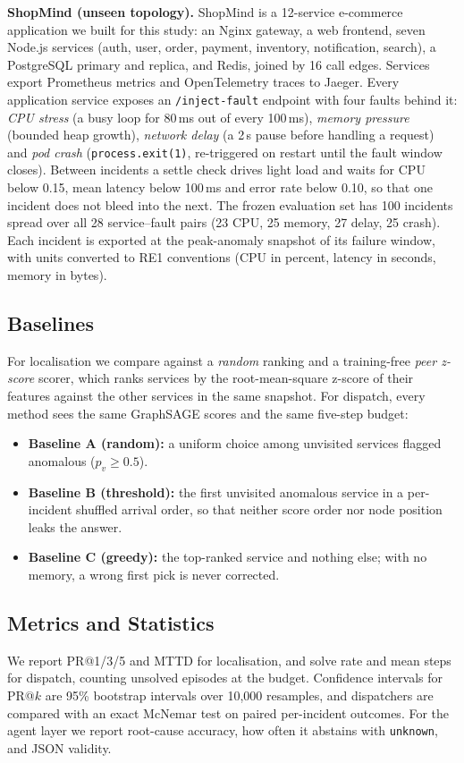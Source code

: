 \documentclass[conference,a4paper]{IEEEtran}
\begin{document}
\textbf{ShopMind (unseen topology).} ShopMind is a 12-service e-commerce application we built for this study: an Nginx gateway, a web frontend, seven Node.js services (auth, user, order, payment, inventory, notification, search), a PostgreSQL primary and replica, and Redis, joined by 16 call edges. Services export Prometheus metrics and OpenTelemetry traces to Jaeger. Every application service exposes an \texttt{/inject-fault} endpoint with four faults behind it: \emph{CPU stress} (a busy loop for 80\,ms out of every 100\,ms), \emph{memory pressure} (bounded heap growth), \emph{network delay} (a 2\,s pause before handling a request) and \emph{pod crash} (\texttt{process.exit(1)}, re-triggered on restart until the fault window closes). Between incidents a settle check drives light load and waits for CPU below 0.15, mean latency below 100\,ms and error rate below 0.10, so that one incident does not bleed into the next. The frozen evaluation set has 100 incidents spread over all 28 service--fault pairs (23 CPU, 25 memory, 27 delay, 25 crash). Each incident is exported at the peak-anomaly snapshot of its failure window, with units converted to RE1 conventions (CPU in percent, latency in seconds, memory in bytes).

\subsection{Baselines}
For localisation we compare against a \emph{random} ranking and a training-free \emph{peer z-score} scorer, which ranks services by the root-mean-square z-score of their features against the other services in the same snapshot. For dispatch, every method sees the same GraphSAGE scores and the same five-step budget:
\begin{itemize}
    \item \textbf{Baseline A (random):} a uniform choice among unvisited services flagged anomalous ($p_v\ge0.5$).
    \item \textbf{Baseline B (threshold):} the first unvisited anomalous service in a per-incident shuffled arrival order, so that neither score order nor node position leaks the answer.
    \item \textbf{Baseline C (greedy):} the top-ranked service and nothing else; with no memory, a wrong first pick is never corrected.
\end{itemize}

\subsection{Metrics and Statistics}
We report PR@1/3/5 and MTTD for localisation, and solve rate and mean steps for dispatch, counting unsolved episodes at the budget. Confidence intervals for PR@$k$ are 95\% bootstrap intervals over 10{,}000 resamples, and dispatchers are compared with an exact McNemar test on paired per-incident outcomes. For the agent layer we report root-cause accuracy, how often it abstains with \texttt{unknown}, and JSON validity.
\end{document}
